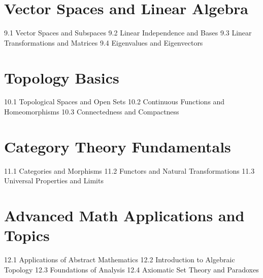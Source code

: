 \section{Vector Spaces and Linear Algebra}
9.1 Vector Spaces and Subspaces
9.2 Linear Independence and Bases
9.3 Linear Transformations and Matrices
9.4 Eigenvalues and Eigenvectors
\section{Topology Basics}
10.1 Topological Spaces and Open Sets
10.2 Continuous Functions and Homeomorphisms
10.3 Connectedness and Compactness
\section{Category Theory Fundamentals}
11.1 Categories and Morphisms
11.2 Functors and Natural Transformations
11.3 Universal Properties and Limits
\section{Advanced Math Applications and Topics}
12.1 Applications of Abstract Mathematics
12.2 Introduction to Algebraic Topology
12.3 Foundations of Analysis
12.4 Axiomatic Set Theory and Paradoxes
